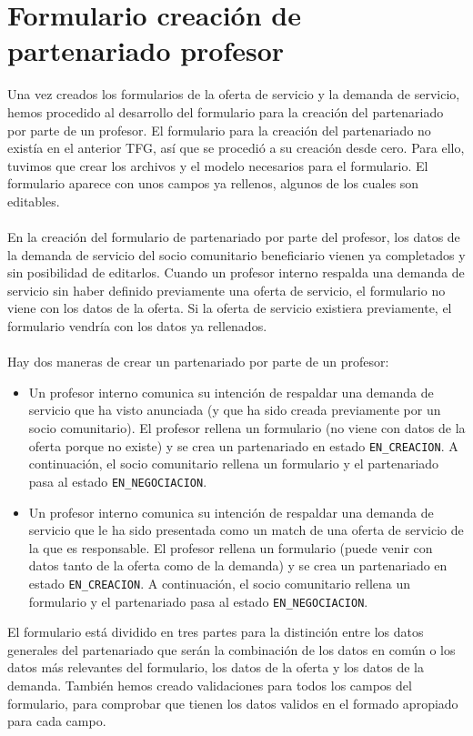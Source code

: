 \documentclass[11pt]{book}
\begin{document}
	\section{Formulario creación de partenariado profesor}
	Una vez creados los formularios de la oferta de servicio y la demanda de servicio, hemos procedido al desarrollo del formulario para la creación del partenariado por parte de un profesor.
	El formulario para la creación del partenariado no existía en el anterior TFG, así que se procedió a su creación desde cero. Para ello, tuvimos que crear los archivos y el modelo necesarios para el formulario. El formulario aparece con unos campos ya rellenos, algunos de los cuales son editables.\\\\
	En la creación del formulario de partenariado por parte del profesor, los datos de la demanda de servicio del socio comunitario beneficiario vienen ya completados y sin posibilidad de editarlos. Cuando un profesor interno respalda una demanda de servicio sin haber definido previamente una oferta de servicio, el formulario no viene con los datos de la oferta. Si la oferta de servicio existiera previamente, el formulario vendría con los datos ya rellenados.\\\\ 
	Hay dos maneras de crear un partenariado por parte de un profesor:
	\begin{itemize}
		\item Un profesor interno comunica su intención de respaldar una
		demanda de servicio que ha visto anunciada (y que ha sido creada
		previamente por un socio comunitario).
		El profesor rellena un formulario (no viene con datos de la oferta
		porque no existe) y se crea un partenariado en estado \texttt{EN\_CREACION}.
		A continuación, el socio comunitario rellena un formulario y el
		partenariado pasa al estado \texttt{EN\_NEGOCIACION}.
		\item Un profesor interno comunica su intención de respaldar una
		demanda de servicio que le ha sido presentada como un match de una
		oferta de servicio de la que es responsable. El profesor rellena un formulario (puede venir con datos tanto de la oferta como de la demanda) y se crea un partenariado en estado \texttt{EN\_CREACION}. A continuación, el socio comunitario rellena un formulario y el partenariado pasa al estado \texttt{EN\_NEGOCIACION}.\\
	\end{itemize}
	El formulario está dividido en tres partes para la distinción entre los datos generales del partenariado que serán la combinación de los datos en común o los datos más relevantes del formulario, los datos de la oferta y los datos de la demanda. También hemos creado validaciones para todos los campos del formulario, para comprobar que tienen los datos validos en el formado apropiado para cada campo.\\\\
\end{document}
